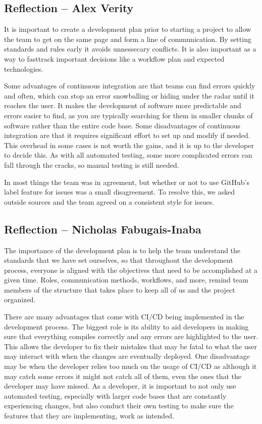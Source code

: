 \documentclass{article}
\begin{document}
\subsection*{Reflection -- Alex Verity}

It is important to create a development plan prior to starting a project to
allow the team to get on the same page and form a line of communication. By
setting standards and rules early it avoids unnessecary conflicts. It is also
important as a way to fasttrack important decisions like a workflow plan and
expected technologies. \newline

Some advantages of continuous integration are that teams can find errors
quickly and often, which can stop an error snowballing or hiding under the
radar until it reaches the user. It makes the development of software more
predictable and errors easier to find, as you are typically searching for
them in smaller chunks of software rather than the entire code base.
Some disadvantages of continuous integration are that it requires significant
effort to set up and modify if needed. This overhead in some cases is not
worth the gains, and it is up to the developer to decide this. As with all
automated testing, some more complicated errors can fall through the cracks,
so manual testing is still needed. \newline

In most things the team was in agreement, but whether or not to use GitHub's
label feature for issues was a small disagreement. To resolve this, we asked
outside sources and the team agreed on a consistent style for issues.

\subsection*{Reflection -- Nicholas Fabugais-Inaba}

The importance of the development plan is to help the team understand the
standards that we have set ourselves, so that throughout the development
process, everyone is aligned with the objectives that need to be
accomplished at a given time. Roles, communication methods, workflows,
and more, remind team members of the structure that takes place to
keep all of us and the project organized. \newline

There are many advantages that come with CI/CD being implemented in
the development process. The biggest role is its ability to aid developers
in making sure that everything compiles correctly and any errors are
highlighted to the user. This allows the developer to fix their mistakes
that may be fatal to what the user may interact with when the changes are
eventually deployed. One disadvantage may be when the developer relies
too much on the usage of CI/CD as although it may catch some errors
it might not catch all of them, even the ones that the developer may have
missed. As a developer, it is important to not only use automated testing,
especially with larger code bases that are constantly experiencing changes,
but also conduct their own testing to make sure the features that they are
implementing, work as intended. \newline
\end{document}
